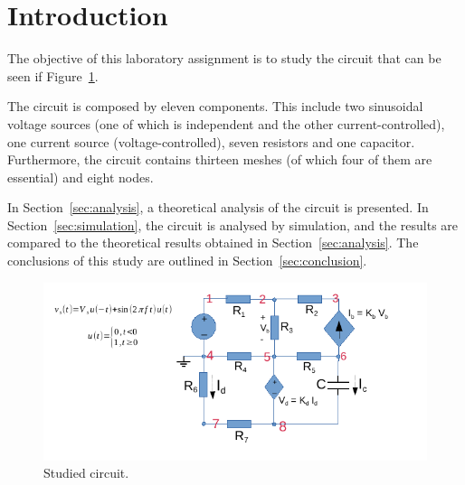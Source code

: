 \section{Introduction}
\label{sec:introduction}

The objective of this laboratory assignment is to study the circuit that can be seen if Figure~\ref{fig:T2Circuit}.
 
The circuit is composed by eleven components. This include two sinusoidal voltage sources (one of which is independent and the other current-controlled), one current source (voltage-controlled), seven resistors and one capacitor. Furthermore, the circuit contains thirteen meshes (of which four of them are essential) and eight nodes.

In Section~\ref{sec:analysis}, a theoretical analysis of the circuit is
presented. In Section~\ref{sec:simulation}, the circuit is analysed by
simulation, and the results are compared to the theoretical results obtained in Section~\ref{sec:analysis}. The conclusions of this study are outlined in
Section~\ref{sec:conclusion}.

\vspace{4.0cm}

\begin{figure}[h] \centering
\includegraphics[width=0.8\linewidth]{T2Circuit.pdf}
\caption{Studied circuit.}
\label{fig:T2Circuit}
\end{figure}
